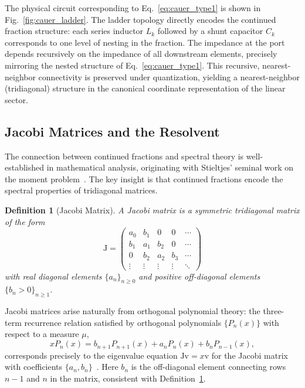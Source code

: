 \documentclass[reprint, floatfix, superscriptaddress, amsmath, amssymb, longbibliography]{revtex4-2}
\newtheorem{definition}[theorem]{Definition}
\begin{document}
The physical circuit corresponding to Eq.~\eqref{eq:cauer_type1} is shown in Fig.~\ref{fig:cauer_ladder}. The ladder topology directly encodes the continued fraction structure: each series inductor $L_k$ followed by a shunt capacitor $C_k$ corresponds to one level of nesting in the fraction. The impedance at the port depends recursively on the impedance of all downstream elements, precisely mirroring the nested structure of Eq.~\eqref{eq:cauer_type1}. This recursive, nearest-neighbor connectivity is preserved under quantization, yielding a nearest-neighbor (tridiagonal) structure in the canonical coordinate representation of the linear sector.

\subsection{Jacobi Matrices and the Resolvent}
\label{sec:jacobi_resolvent}

The connection between continued fractions and spectral theory is well-established in mathematical analysis, originating with Stieltjes' seminal work on the moment problem~\cite{Stieltjes1894}. The key insight is that continued fractions encode the spectral properties of tridiagonal matrices.

\begin{definition}[Jacobi Matrix]
\label{def:jacobi_matrix}
A \emph{Jacobi matrix} is a symmetric tridiagonal matrix of the form
\begin{equation}
\mathrm{J} = \begin{pmatrix}
a_0 & b_1 & 0 & 0 & \cdots \\
b_1 & a_1 & b_2 & 0 & \cdots \\
0 & b_2 & a_2 & b_3 & \cdots \\
\vdots & \vdots & \vdots & \vdots & \ddots
\end{pmatrix}
\label{eq:jacobi_matrix}
\end{equation}
with real diagonal elements $\{a_n\}_{n \geq 0}$ and positive off-diagonal elements $\{b_n > 0\}_{n \geq 1}$.
\end{definition}

Jacobi matrices arise naturally from orthogonal polynomial theory: the three-term recurrence relation satisfied by orthogonal polynomials $\{P_n(x)\}$ with respect to a measure $\mu$,
\begin{equation}
x P_n(x) = b_{n+1} P_{n+1}(x) + a_n P_n(x) + b_n P_{n-1}(x),
\label{eq:three_term_recurrence}
\end{equation}
corresponds precisely to the eigenvalue equation $\mathrm{J} \mathrm{v} = x \mathrm{v}$ for the Jacobi matrix with coefficients $\{a_n, b_n\}$~\cite{Chihara1978, Szego1939}. Here $b_n$ is the off-diagonal element connecting rows $n-1$ and $n$ in the matrix, consistent with Definition~\ref{def:jacobi_matrix}.
\end{document}

